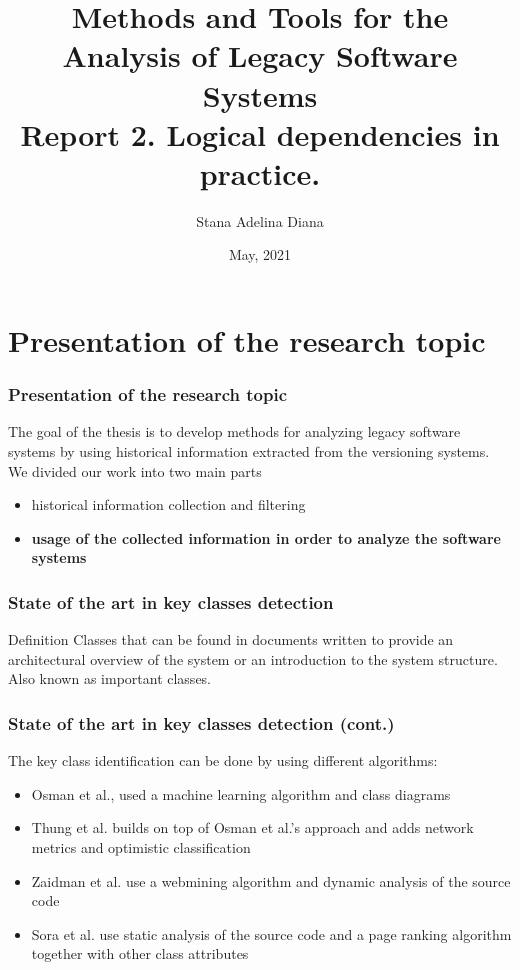 \documentclass{beamer}
\title[Pres]{Methods and Tools for the Analysis of Legacy Software
Systems\\
Report 2. Logical dependencies in practice.
 }
\author{Stana Adelina Diana}
\institute{Computer Science and Engineering Department\\
"Politehnica" University of Timisoara}
\date{May, 2021}
\begin{document}
\begin{frame}
  \titlepage
\end{frame}

\section{Presentation of the research topic}
 \begin{frame}
\frametitle{Presentation of the research topic}
The goal of the thesis is to develop methods for analyzing legacy software systems by using historical information extracted from the versioning systems.
We divided our work into two main parts

\begin{itemize}
\item historical information collection and filtering
\item \textbf{usage of the collected information in order to analyze the software systems}
\end{itemize}

\end{frame}


 \begin{frame}
\frametitle{State of the art in key classes detection}
\begin{block}{Definition}
 Classes that can be found in documents written to provide an architectural overview of the system or an introduction to the system structure. Also known as important classes.
\end{block}

\end{frame}


 \begin{frame}
\frametitle{State of the art in key classes detection (cont.)}
 The key class identification can be done by using different algorithms:
\begin{itemize}
\item Osman et al., used a machine learning algorithm and class diagrams  \cite{6676885}
\item Thung et al. builds on top of Osman et al.’s approach and adds network metrics and optimistic classification \cite{rocclasification}
\item Zaidman et al. use a webmining algorithm and dynamic analysis of the source code \cite{ZaidmanJurnal}
\item Sora et al. use static analysis of the source code and a page ranking algorithm together with other class attributes \cite{Finding-key-classes}
\end{itemize}

\end{frame}
\end{document}
